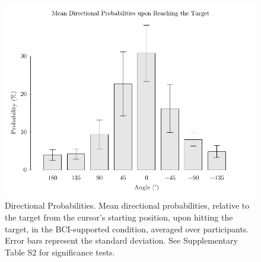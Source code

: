 \begin{figure}[p]
    \renewcommand\thefigure{\ref{chapter:nat}.S4}
    \centering
    \includegraphics[width=\textwidth]{figures/nat-app-fig-s4.pdf}
    \caption[Mean directional probabilities upon hitting the target.]{Directional Probabilities. Mean directional probabilities, relative to the target from the cursor's starting position, upon hitting the target, in the BCI-supported condition, averaged over participants. Error bars represent the standard deviation. See Supplementary Table S2 for significance tests.}
\end{figure}

